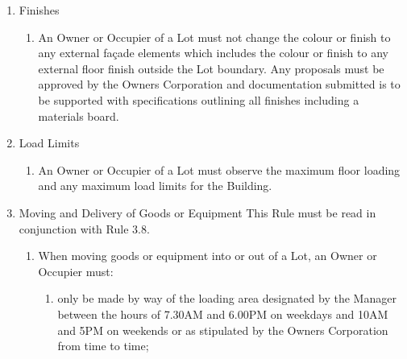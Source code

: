 \documentclass{article}
\begin{document}
\begin{enumerate}[label=\arabic*.]
\begin{enumerate}[label=\arabic{enumi}.\arabic*.]
\begin{enumerate}[label=\arabic{enumi}.\arabic*.]
\begin{enumerate}[label=(\arabic*)]
\item  An Owner or Occupier of a Lot must not use the water closets, drains and other apparatus for any purpose other than those for which they were constructed and not sweep or allow rubbish or other substances to be deposited in them. Any costs of expenses resulting from damage or blockage to such water closets, drains, water apparatus, waste pipes and the like cause by an Owner or Occupier of a Lot will be the responsibility of the Lot Owner.

\end{enumerate}

\item  Finishes

\begin{enumerate}[label=(\arabic*)]

\item  An Owner or Occupier of a Lot must not change the colour or finish to any external façade elements which includes the colour or finish to any external floor finish outside the Lot boundary. Any proposals must be approved by the Owners Corporation and documentation submitted is to be supported with specifications outlining all finishes including a materials board.

\end{enumerate}

\item  Load Limits

\begin{enumerate}[label=(\arabic*)]

\item  An Owner or Occupier of a Lot must observe the maximum floor loading and any maximum load limits for the Building.
\newpage



\end{enumerate}

\item  Moving and Delivery of Goods or Equipment This Rule must be read in conjunction with Rule 3.8.

\begin{enumerate}[label=(\arabic*)]

\item  When moving goods or equipment into or out of a Lot, an Owner or Occupier must:

\begin{enumerate}[label=(\alph*)]

\item  only be made by way of the loading area designated by the Manager between the hours of 7.30AM and 6.00PM on weekdays and 10AM and 5PM on weekends or as stipulated by the Owners Corporation from time to time;


\end{enumerate}
\end{enumerate}
\end{enumerate}
\end{enumerate}
\end{enumerate}
\end{document}
